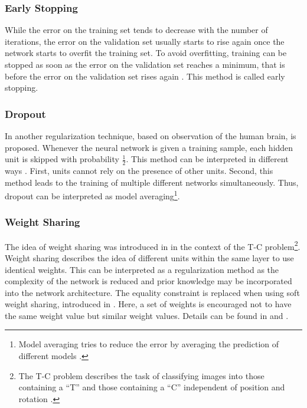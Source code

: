 \subsubsection{Early Stopping}

While the error on the training set tends to decrease with the number of iterations, the error on the validation set usually starts to rise again once the network starts to overfit the training set. To avoid overfitting, training can be stopped as soon as the error on the validation set reaches a minimum, that is before the error on the validation set rises again \cite{Bishop:1995}. This method is called early stopping.

\subsubsection{Dropout}

In \cite{HintonSrivastavaKrizhevskySutskeverSalakhutdinov:2012} another regularization technique, based on observation of the human brain, is proposed. Whenever the neural network is given a training sample, each hidden unit is skipped with probability $\frac{1}{2}$. This method can be interpreted in different ways \cite{HintonSrivastavaKrizhevskySutskeverSalakhutdinov:2012}. First, units cannot rely on the presence of other units. Second, this method leads to the training of multiple different networks simultaneously. Thus, dropout can be interpreted as model averaging\footnote{Model averaging tries to reduce the error by averaging the prediction of different models \cite{HintonSrivastavaKrizhevskySutskeverSalakhutdinov:2012}.}.

\subsubsection{Weight Sharing}
\label{subsubsec:weight-sharing}

The idea of weight sharing was introduced in \cite{RumelhartHintonWilliams:1986} in the context of the T-C problem\footnote{The T-C problem describes the task of classifying images into those containing a ``T'' and those containing a ``C'' independent of position and rotation \cite{RumelhartHintonWilliams:1986}.}. Weight sharing describes the idea of different units within the same layer to use identical weights. This can be interpreted as a regularization method as the complexity of the network is reduced and prior knowledge may be incorporated into the network architecture. The equality constraint is replaced when using soft weight sharing, introduced in \cite{NowlanHinton:1992}. Here, a set of weights is encouraged not to have the same weight value but similar weight values. Details can be found in \cite{NowlanHinton:1992} and \cite{Bishop:1995}.

